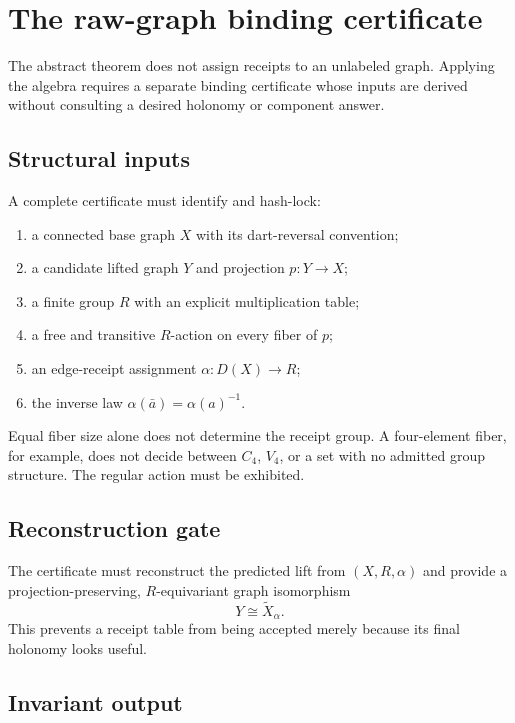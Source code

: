 \section{The raw-graph binding certificate}

The abstract theorem does not assign receipts to an unlabeled graph. Applying
the algebra requires a separate binding certificate whose inputs are derived
without consulting a desired holonomy or component answer.

\subsection*{Structural inputs}

A complete certificate must identify and hash-lock:

\begin{enumerate}
\item a connected base graph $X$ with its dart-reversal convention;
\item a candidate lifted graph $Y$ and projection $p:Y\to X$;
\item a finite group $R$ with an explicit multiplication table;
\item a free and transitive $R$-action on every fiber of $p$;
\item an edge-receipt assignment $\alpha:D(X)\to R$;
\item the inverse law $\alpha(\bar a)=\alpha(a)^{-1}$.
\end{enumerate}

Equal fiber size alone does not determine the receipt group. A four-element
fiber, for example, does not decide between $C_4$, $V_4$, or a set with no
admitted group structure. The regular action must be exhibited.

\subsection*{Reconstruction gate}

The certificate must reconstruct the predicted lift from $(X,R,\alpha)$ and
provide a projection-preserving, $R$-equivariant graph isomorphism
\[
Y\cong\widetilde X_{\alpha}.
\]
This prevents a receipt table from being accepted merely because its final
holonomy looks useful.

\subsection*{Invariant output}

